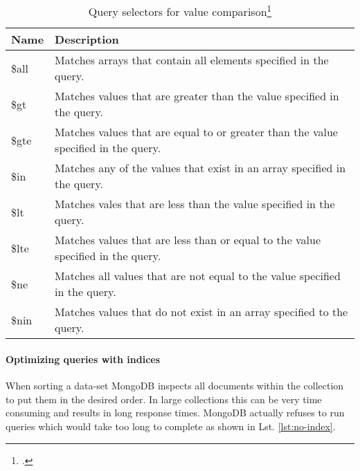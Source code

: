 \begin{listing}
    \caption[Exemplary usage of query operators]{Exemplary usage of query operators\footcite[][9]{mongo_crud_manual}}
    \label{lst:query-operators}
\end{listing}


\begin{savenotes}
\begin{table}[htbp]
\begin{tabular*}{\textwidth}{p{} p{}}
\toprule
\textbf{Name} 					& \textbf{Description}\\
\midrule 
\$all    & Matches arrays that contain all elements specified in the query. \\
\$gt     & Matches values that are greater than the value specified in the query.\\
\$gte    & Matches values that are equal to or greater than the value specified in the query.\\
\$in     & Matches any of the values that exist in an array specified in the query.\\
\$lt     & Matches vales that are less than the value specified in the query.\\
\$lte    & Matches values that are less than or equal to the value specified in the query.\\
\$ne     & Matches all values that are not equal to the value specified in the query.\\
\$nin    & Matches values that do not exist in an array specified to the query.\\
\bottomrule 
\end{tabular*}
  \caption[Query selectors for value comparison]{Query selectors for value comparison\footcite[][]{mongo_query_ops}}
  \label{tab:query-selectors-compare}
\end{table}
\end{savenotes}


\paragraph{Optimizing queries with indices}
When sorting a data-set MongoDB inspects all documents within the collection
to put them in the desired order. In large collections this can be very time
consuming and results in long response times.
MongoDB actually refuses to run queries which would take too long to complete as shown in
Lst. \ref{lst:no-index}.

